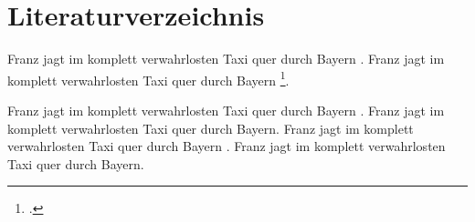 \documentclass[10pt, a4paper]{article}
\begin{document}
\tableofcontents
\section{Literaturverzeichnis}
Franz jagt im komplett verwahrlosten Taxi quer durch Bayern \parencite[siehe][S. 12-14]{lkgt}. Franz jagt im komplett verwahrlosten Taxi quer durch Bayern \footcite[siehe][Kapitel 3. Seite 455]{bworld}.

Franz jagt im komplett verwahrlosten Taxi quer durch Bayern \parencite{dlb,lkgt}.  Franz jagt im komplett verwahrlosten Taxi quer durch Bayern.  Franz jagt im komplett verwahrlosten Taxi quer durch Bayern \textcite{article1}. Franz jagt im komplett verwahrlosten Taxi quer durch Bayern.


\printbibliography
\end{document}
